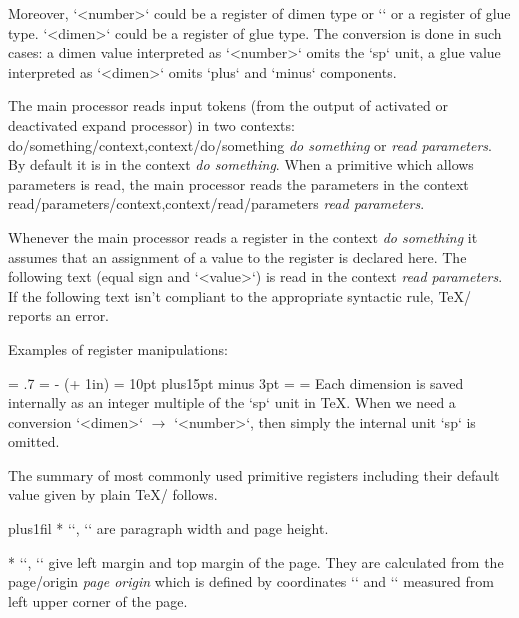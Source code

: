 {\removelastskip
Moreover, `<number>` could be a register of dimen type or `\dimexpr`
or a register of glue type. `<dimen>` could be a register of glue type.
The conversion is done in such cases: a dimen value interpreted as
`<number>` omits the `sp` unit, a glue value interpreted as `<dimen>`
omits `plus` and `minus` components.

The main processor reads input tokens (from the output of activated or
deactivated expand processor) in two contexts: 
\ii do/something/context,context/do/something {\em do something} or {\em
read parameters}. By default it is in the context {\em do something}. When a
primitive which allows parameters is read, the main processor reads the
parameters in the context \ii read/parameters/context,context/read/parameters {\em read parameters}.

Whenever the main processor reads a register in the context
{\em do something} it assumes that an assignment of a value to the register
is declared here. The following text (equal sign and `<value>`) is read in the context
{\em read parameters}. If the following text isn't
compliant to the appropriate syntactic rule, \TeX/ reports an error.

Examples of register manipulations:

\begtt
\newcount\mynumber \newdimen\mydimen \newskip\myskip
\hsize = .7\hsize  %
\hoffset = \dimexpr 10mm - (\parindent + 1in) \relax %
\myskip = 10pt plus15pt minus 3pt
\mydimen = \myskip    %
\mynumber = \mydimen  %
\endtt
%
Each dimension is saved internally as an integer multiple of the `sp` unit in
\TeX. When we need a conversion `<dimen>` $\to$ `<number>`, then simply the
internal unit `sp` is omitted.

The summary of most commonly used primitive registers including their default
value given by plain \TeX/ follows.

\let\makedest=\makedestactive

\begitems  \rightskip=0pt plus1fil
* \y`\hsize=6.5in`,
  \y`\vsize=8.9in`
  are paragraph width and page height.

* \y`\hoffset=0pt`,
  \y`\voffset=0pt` give left margin and top margin of the page. They are
  calculated from the \ii page/origin {\em page origin} which is defined by coordinates
  \y`\pdfvorigin=1in` and \y`\pdfhorigin=1in` measured from left upper corner of
  the page.

}
